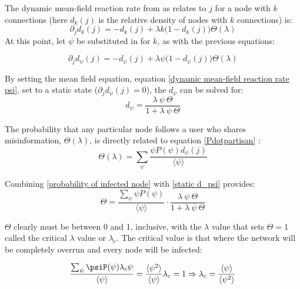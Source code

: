 \documentclass[preprint,review,12pt]{elsarticle}
\begin{document}
The dynamic mean-field reaction rate from \citep{marro2005nonequilibrium,pastor2001dynamics,pastor2001epidemic} as relates to $j$ for a node with $k$ connections (here $d_k(j)$ is the relative density of nodes with $k$ connections) is: 
\begin{equation}
\label{dynamic mean-field reaction rate}
    \partial_jd_k(j) = - d_k(j) + \lambda k \big(1 - d_k(j)\big)\Theta(\lambda)
\end{equation}
At this point, let $\psi$ be substituted in for $k$, as with the previous equations:

\begin{equation}
\label{dynamic mean-field reaction rate psi}
    \partial_jd_{\psi}(j) = - d_{\psi}(j) + \lambda \psi \big(1 - d_{\psi}(j)\big)\Theta(\lambda)
\end{equation}

By setting the mean field equation, equation \ref{dynamic mean-field reaction rate psi}, set to a static state ($\partial_jd_{\psi}(j) = 0$), the $d_{\psi}$ can be solved for:
\begin{equation}
\label{static d_psi}
    d_{\psi} = \frac{\lambda \ \psi \ \Theta}{1 + \lambda \ \psi \ \Theta}
\end{equation}

The probability that any particular node follows a user who shares misinformation, $\Theta(\lambda)$, is directly related to equation \ref{Pdotpartisan} :
\begin{equation}
\label{probability of infected node}
    \Theta(\lambda) = \sum_{\psi} \frac{\psi P(\psi)d_{\psi}(j)}{\langle \psi \rangle}
\end{equation}

Combining \ref{probability of infected node} with \ref{static d_psi} provides:
\begin{equation}
    \Theta =  \frac{\sum_{\psi} \psi P(\psi)}{\langle \psi \rangle}\cdot \frac{\lambda \ \psi \ \Theta}{1 + \lambda \ \psi \ \Theta}
\end{equation}

$\Theta$ clearly must be between 0 and 1, inclusive, with the $\lambda$ value that sets $\Theta = 1$ called the critical $\lambda$ value or $\lambda_c$. The critical value is that where the network will be completely overrun and every node will be infected: 

\begin{equation}
\label{critical value equation}
    \frac{\sum_{\psi} \psiP(\psi)\lambda_c\psi}{\langle \psi \rangle} = \frac{\langle \psi^2 \rangle}{\langle \psi \rangle}\lambda_c = 1 \Rightarrow \lambda_c = \frac{\langle \psi \rangle}{\langle \psi^2 \rangle}
\end{equation}
\end{document}
